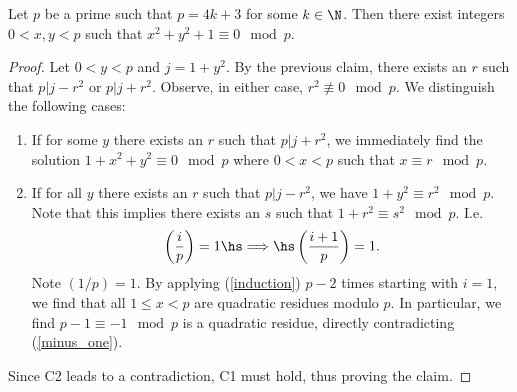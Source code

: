 \documentclass{article}
\begin{document}
\begin{claim*}[2]
   Let $p$ be a prime such that $p=4k+3$ for some $k\in\N$. Then there exist 
   integers $0<x,y<p$ such that $x^2+y^2+1\equiv 0\mod p$.
   \begin{proof}
      Let $0<y<p$ and $j=1+y^2$. By the previous claim, there exists an $r$ such that 
      $p|j-r^2$ or $p|j+r^2$. Observe, in either case, $r^2\not\equiv 0\mod p$. We distinguish the following cases:
      \begin{enumerate}[label=C\arabic*.]
         \item If for some $y$ there exists an $r$ such that $p|j+r^2$, we immediately find the 
            solution $1+x^2+y^2\equiv 0\mod p$ where $0<x<p$ such that $x\equiv r\mod p$.
         \item If for all $y$ there exists an $r$ such that $p|j-r^2$, we have $1+y^2\equiv r^2\mod p$.
            Note that this implies there exists an $s$ such that $1+r^2\equiv s^2\mod p$. I.e.
            \begin{align}
               \label{induction}
               \left(\frac{i}{p}\right)=1\hs\Longrightarrow\hs \left(\frac{i+1}{p}\right)=1.
            \end{align}
            Note $(1/p)=1$.  By applying (\ref{induction}) $p-2$ times starting with $i=1$, we find that 
            all $1\leq x<p$ are quadratic residues modulo $p$. In particular, we find $p-1\equiv -1\mod p$
            is a quadratic residue, directly contradicting (\ref{minus_one}).
      \end{enumerate}
      Since C2 leads to a contradiction, C1 must hold, thus proving the claim.
   \end{proof}
\end{claim*}
\end{document}
